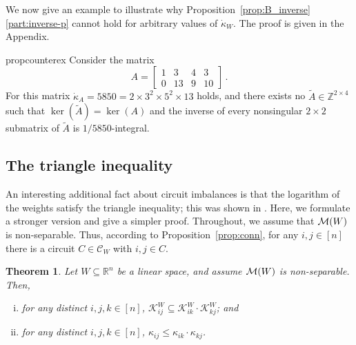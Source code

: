 \documentclass[11pt, a4paper]{article}
\newcommand{\Le}{\kappa}
\newcommand{\circuits}{\mathcal{C}}
\newcommand{\1}{\mathbbm{1}}
\newcommand{\kd}{{\dot{\kappa}}}
\newcommand{\KK}{\mathcal K}
\newtheorem{theorem}{Theorem}[section]
\theoremstyle{case}
\newcommand{\R}{\mathbb{R}}
\newcommand{\Z}{\mathbb{Z}}
\begin{document}
We now give an example to illustrate why Proposition~\ref{prop:B_inverse}\ref{part:inverse-p} cannot hold for arbitrary values of $\kd_W$. The proof is given in the Appendix.
\begin{restatable}{prop}{counterex}\label{prop:counterexample}
Consider the matrix 
$$A = \begin{bmatrix} 1 & 3 & 4 & 3 \\ 0 & 13 & 9 & 10 \end{bmatrix}\, .$$
For this matrix
$\dot{\kappa}_A = 5850 = 2 \times 3^2 \times 5^2 \times 13$ holds, and 
there exists no $\tilde A\in\Z^{2\times 4}$ such that $\ker(\tilde A)=\ker(A)$ and the inverse of every nonsingular $2\times 2$ submatrix of $\tilde A$ is $1/5850$-integral.
\end{restatable}

 

\subsection{The triangle inequality}\label{sec:triangle}
An interesting additional fact about circuit imbalances is that the logarithm of the weights satisfy the triangle inequality; this was shown in \cite{DHNV20}. Here, we formulate a stronger version and give a simpler proof. Throughout, we assume that ${\cal M}(W)$ is non-separable. Thus, according to Proposition~\ref{prop:conn}, for any $i,j\in [n]$ there is a circuit $C\in \circuits_W$ with $i,j\in C$.
\begin{theorem}\label{thm:imbalance_triangle_inequality}
Let $W\subseteq \R^n$ be a linear space, and assume ${\cal M}(W)$ is non-separable. Then, 
  \begin{enumerate}[(i)]
  \item\label{i:set_triangle_inequality} for any distinct $i,j,k\in [n]$,
  $\KK_{ij}^W \subseteq \KK_{ik}^W \cdot\KK_{kj}^W$; and 
  \item \label{i:triangle} for any distinct $i,j,k\in [n]$,
  $\Le_{ij} \leq \Le_{ik}\cdot \Le_{kj}$.
  \end{enumerate}
  \end{theorem}
\end{document}
